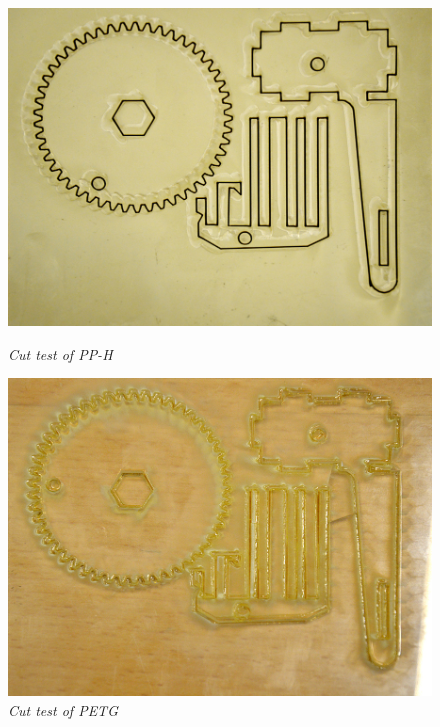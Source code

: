 \begin{figure}[h]
\begin{minipage}[b]{7.5cm}
	\centering
	\includegraphics[scale=1.0]{figures/PP-H.jpg}
	\caption{\small {\it {Cut test of PP-H}}} \label{fig:PP-H}
\end{minipage}
\begin{minipage}[b]{7.5cm}
	\centering
	\includegraphics[scale=1.0]{figures/PETG.jpg}
	\caption{\small {\it {Cut test of PETG}}} \label{fig:PETG}
\end{minipage}
\end{figure}

